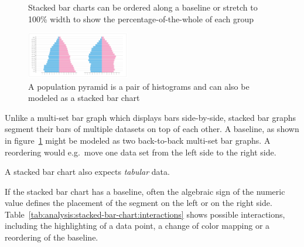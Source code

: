 \begin{figure}
  \centering
    \qquad
    \caption{Stacked bar charts can be ordered along a baseline or stretch to 100\% width to show the percentage-of-the-whole of each group}%
    \label{fig:analysis:stacked-bar-chart}
\end{figure}
\begin{figure}
  \centering
    \includegraphics[width=0.4\textwidth]{figures/analysis/population-pyramid.png}%
    \caption{A population pyramid is a pair of histograms and can also be modeled as a stacked bar chart}%
    \label{fig:analysis:population-pyramid}
\end{figure}

Unlike a multi-set bar graph which displays bars side-by-side, stacked bar graphs segment their bars of multiple datasets on top of each other.
A baseline, as shown in figure~\ref{fig:analysis:stacked-bar-chart} might be modeled as two back-to-back multi-set bar graphs. A reordering would e.g.\ move one data set from the left side to the right side.

A stacked bar chart also expects \emph{tabular} data.

If the stacked bar chart has a baseline, often the algebraic sign of the numeric value defines the placement of the segment on the left or on the right side.
Table~\ref{tab:analysis:stacked-bar-chart:interactions} shows possible interactions, including the highlighting of a data point, a change of color mapping or a reordering of the baseline.

